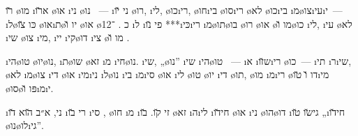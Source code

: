 \u{רו} \o{מו}  \i{א}\u{רו}  \o{או} \i{ני} \o{נו}  ~— \i{ני} \u{יו}  \o{רו}, \i{לי}, \o{כו}\i{רי}, \o{חו}\i{בי} \o{סו}\i{רי} \o{לא} \o{כו}\i{בי} \i{מ}\o{צו}\i{עי}\i{י}~— \i{ל}\o{כּו}  \u{צו} \o{או}\i{ת}\o{יו} \u{ו} \o{או} \o{כ}  .   ־12 \i{ל} \i{פי} \u{נו} ***\i{כּי}\i{רי}     \i{מ}\o{תו}\o{בו} \o{רו} \o{או}  \o{מו} \u{ו}\o{כו} \i{לי},  \i{עי}    \o{לא} \i{שי} \o{צו} \i{מי},  \i{יי}   \i{קי}\o{דו} \i{צי}\gnuva {} \o{מו} \u{ו}    .

\i{הי}\o{טו}  \o{יו}\o{נו},  \i{ת}\o{שו} \o{זא}  \i{מ} \i{חי}\o{נו}. \i{שי}, „\o{נו}”  \i{שי}   \i{הי}\o{טו} ~— \i{א} \i{ש}\u{זו}\i{רי} \o{כו}~— \i{תי} \i{ר}\i{שי}, \o{לא}  \i{מ}\o{צו}  \i{די} \o{או} \i{מי}\i{ני} \i{ל}\o{נו}   \i{בי} \i{מ}\i{סי} \o{או} \i{לי} \o{טו} \o{יו}  \i{די} \o{תו}, \o{מו} \i{מ}\i{רי}   \o{דו} \u{ו} \u{טו}\i{מי} \o{סו}\o{פּו} \u{ו}\i{מ}\i{י}.

\i{ני}, א״ב \u{הוא} \u{דו}  \i{רי}  \u{בו}  \i{סי} ,  \o{חו} \i{מ} \i{זי}  \u{קו}. \u{בו} \o{זא} \i{ה}\i{לי}   \i{חי}\u{דו}  \o{או} \i{ני} \o{הו}\o{דו} \i{גי}\u{שו} \u{טו}  „\i{חי}\u{דו} \o{נו}\o{לו}\i{גי}”.


